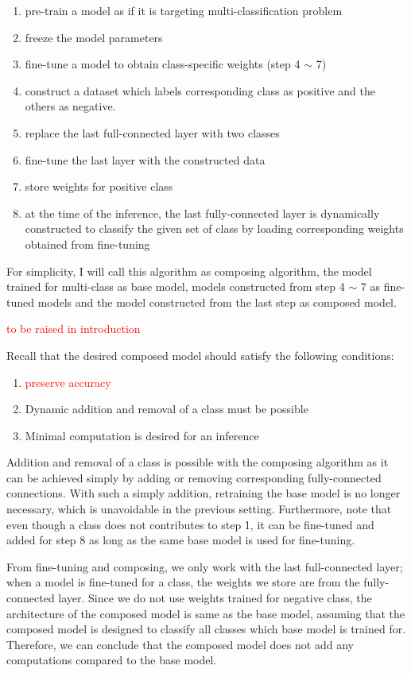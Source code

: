 \documentclass{article}
\newcommand{\red}[1]{\textcolor{red}{#1}}
\begin{document}
\begin{enumerate}
    \item pre-train a model as if it is targeting multi-classification problem
    \item freeze the model parameters
    \item fine-tune a model to obtain class-specific weights (step 4 $\sim$ 7)
    \item construct a dataset which labels corresponding class as positive and the others as negative.
    \item replace the last full-connected layer with two classes
    \item fine-tune the last layer with the constructed data
    \item store weights for positive class
    \item at the time of the inference, the last fully-connected layer is dynamically constructed to classify the given set of class by loading corresponding weights obtained from fine-tuning
\end{enumerate}

For simplicity, I will call this algorithm as composing algorithm, the model trained for multi-class as base model, models constructed from step 4 $\sim$ 7 as fine-tuned models and the model constructed from the last step as composed model.

\red{to be raised in introduction}

Recall that the desired composed model should satisfy the following conditions:

\begin{enumerate}
    \item \red{preserve accuracy}
    \item Dynamic addition and removal of a class must be possible
    \item Minimal computation is desired for an inference
\end{enumerate}

Addition and removal of a class is possible with the composing algorithm as it can be achieved simply by adding or removing corresponding fully-connected connections.
With such a simply addition, retraining the base model is no longer necessary, which is unavoidable in the previous setting. Furthermore, note that even though a class does not contributes to step 1, it can be fine-tuned and added for step 8 as long as the same base model is used for fine-tuning.

From fine-tuning and composing, we only work with the last full-connected layer; when a model is fine-tuned for a class, the weights we store are from the fully-connected layer.
Since we do not use weights trained for negative class, the architecture of the composed model is same as the base model, assuming that the composed model is designed to classify all classes which base model is trained for. Therefore, we can conclude that the composed model does not add any computations compared to the base model.
\end{document}
